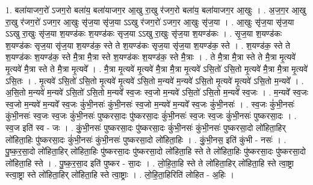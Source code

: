 \documentclass[17pt]{extarticle}
\begin{document}
1. बला॑याजग॒रो॑ ऽजग॒रो बला॑य॒ बला॑याजग॒र आ॒खु रा॒खु र॑जग॒रो बला॑य॒ बला॑याजग॒र आ॒खुः । . अ॒ज॒ग॒र आ॒खु रा॒खु र॑जग॒रो॑ ऽजग॒र आ॒खुः सृ॑ज॒या सृ॑ज॒या ऽऽखु र॑जग॒रो॑ ऽजग॒र आ॒खुः सृ॑ज॒या । . आ॒खुः सृ॑ज॒या सृ॑ज॒या ऽऽखु रा॒खुः सृ॑ज॒या श॒यण्ड॑कः श॒यण्ड॑कः सृज॒या ऽऽखु रा॒खुः सृ॑ज॒या श॒यण्ड॑कः । . सृ॒ज॒या श॒यण्ड॑कः श॒यण्ड॑कः सृज॒या सृ॑ज॒या श॒यण्ड॑क॒ स्ते ते श॒यण्ड॑कः सृज॒या सृ॑ज॒या श॒यण्ड॑क॒ स्ते । . श॒यण्ड॑क॒ स्ते ते श॒यण्ड॑कः श॒यण्ड॑क॒ स्ते मै॒त्रा मै॒त्रा स्ते श॒यण्ड॑कः श॒यण्ड॑क॒ स्ते मै॒त्राः । . ते मै॒त्रा मै॒त्रा स्ते ते मै॒त्रा मृ॒त्यवे॑ मृ॒त्यवे॑ मै॒त्रा स्ते ते मै॒त्रा मृ॒त्यवे᳚ । . मै॒त्रा मृ॒त्यवे॑ मृ॒त्यवे॑ मै॒त्रा मै॒त्रा मृ॒त्यवे॑ ऽसि॒तो॑ ऽसि॒तो मृ॒त्यवे॑ मै॒त्रा मै॒त्रा मृ॒त्यवे॑ ऽसि॒तः । . मृ॒त्यवे॑ ऽसि॒तो॑ ऽसि॒तो मृ॒त्यवे॑ मृ॒त्यवे॑ ऽसि॒तो म॒न्यवे॑ म॒न्यवे॑ ऽसि॒तो मृ॒त्यवे॑ मृ॒त्यवे॑ ऽसि॒तो म॒न्यवे᳚ । . अ॒सि॒तो म॒न्यवे॑ म॒न्यवे॑ ऽसि॒तो॑ ऽसि॒तो म॒न्यवे᳚ स्व॒जः स्व॒जो म॒न्यवे॑ ऽसि॒तो॑ ऽसि॒तो म॒न्यवे᳚ स्व॒जः । . म॒न्यवे᳚ स्व॒जः स्व॒जो म॒न्यवे॑ म॒न्यवे᳚ स्व॒जः कुं॑भी॒नसः॑ कुंभी॒नसः॑ स्व॒जो म॒न्यवे॑ म॒न्यवे᳚ स्व॒जः कुं॑भी॒नसः॑ । . स्व॒जः कुं॑भी॒नसः॑ कुंभी॒नसः॑ स्व॒जः स्व॒जः कुं॑भी॒नसः॑ पुष्करसा॒दः पु॑ष्करसा॒दः कुं॑भी॒नसः॑ स्व॒जः स्व॒जः कुं॑भी॒नसः॑ पुष्करसा॒दः । . स्व॒ज इति॑ स्व - जः । . कुं॒भी॒नसः॑ पुष्करसा॒दः पु॑ष्करसा॒दः कुं॑भी॒नसः॑ कुंभी॒नसः॑ पुष्करसा॒दो लो॑हिता॒हिर् लो॑हिता॒हिः पु॑ष्करसा॒दः कुं॑भी॒नसः॑ कुंभी॒नसः॑ पुष्करसा॒दो लो॑हिता॒हिः । . कुं॒भी॒नस॒ इति॑ कुंभी - नसः॑ । . पु॒ष्क॒र॒सा॒दो लो॑हिता॒हिर् लो॑हिता॒हिः पु॑ष्करसा॒दः पु॑ष्करसा॒दो लो॑हिता॒हि स्ते ते लो॑हिता॒हिः पु॑ष्करसा॒दः पु॑ष्करसा॒दो लो॑हिता॒हि स्ते । . पु॒ष्क॒र॒सा॒द इति॑ पुष्कर - सा॒दः । . लो॒हि॒ता॒हि स्ते ते लो॑हिता॒हिर् लो॑हिता॒हि स्ते त्वा॒ष्ट्रा स्त्वा॒ष्ट्रा स्ते लो॑हिता॒हिर् लो॑हिता॒हि स्ते त्वा॒ष्ट्राः । . लो॒हि॒ता॒हिरिति॑ लोहित - अ॒हिः । \newline
\end{document}
